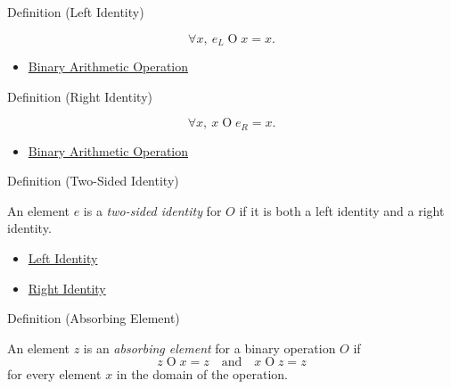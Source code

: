 \begin{definitionbox}{Definition (Left Identity)}
\begin{definition}
\label{def:left-identity}
\[
\forall x,\ e_L\mathbin{O}x=x.
\]
\end{definition}
\end{definitionbox}

\begin{dependencies}
\begin{itemize}
  \item \hyperref[def:binary-arithmetic-operation]{Binary Arithmetic Operation}
\end{itemize}
\end{dependencies}

\begin{definitionbox}{Definition (Right Identity)}
\begin{definition}
\label{def:right-identity}
\[
\forall x,\ x\mathbin{O}e_R=x.
\]
\end{definition}
\end{definitionbox}

\begin{dependencies}
\begin{itemize}
  \item \hyperref[def:binary-arithmetic-operation]{Binary Arithmetic Operation}
\end{itemize}
\end{dependencies}

\begin{definitionbox}{Definition (Two-Sided Identity)}
\begin{definition}
\label{def:two-sided-identity}
An element $e$ is a \emph{two-sided identity} for $O$ if it is both a left
identity and a right identity.
\end{definition}
\end{definitionbox}

\begin{dependencies}
\begin{itemize}
  \item \hyperref[def:left-identity]{Left Identity}
  \item \hyperref[def:right-identity]{Right Identity}
\end{itemize}
\end{dependencies}

\begin{definitionbox}{Definition (Absorbing Element)}
\begin{definition}
\label{def:absorbing-element}
An element $z$ is an \emph{absorbing element} for a binary operation $O$ if
\[
z\mathbin{O}x=z
\quad\text{and}\quad
x\mathbin{O}z=z
\]
for every element $x$ in the domain of the operation.
\end{definition}
\end{definitionbox}

